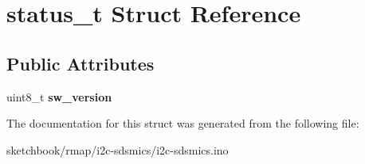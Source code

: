 \hypertarget{structstatus__t}{}\section{status\+\_\+t Struct Reference}
\label{structstatus__t}
\subsection*{Public Attributes}
\begin{DoxyCompactItemize}
\item 
\mbox{\label{structstatus__t_a0e3613ee2221b5f8ba4b941c221ddcc0}} 
uint8\+\_\+t {\bfseries sw\+\_\+version}
\end{DoxyCompactItemize}


The documentation for this struct was generated from the following file\+:\begin{DoxyCompactItemize}
\item 
sketchbook/rmap/i2c-\/sdsmics/i2c-\/sdsmics.\+ino\end{DoxyCompactItemize}
